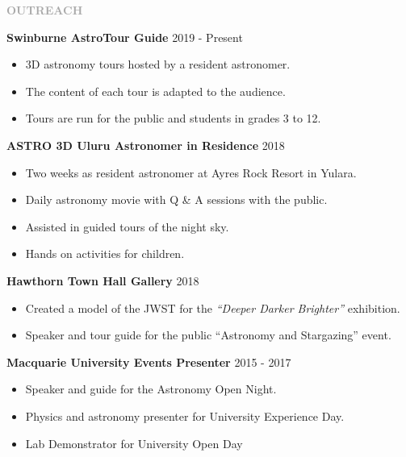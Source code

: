 \documentclass[11pt]{extarticle}
\def\Vhrulefill{{\color{BurntOrange}{\leavevmode\leaders\hrule height 1.2ex depth \dimexpr0.5pt-0.9ex\hfill\kern5pt}}}
\begin{document}
\vspace{3ex}
\noindent
\textcolor{darkgray}{\Large\normalfont\bfseries\MakeUppercase{Outreach}} \Vhrulefill
\vspace{2ex}



\noindent
\textbf{Swinburne AstroTour Guide} \hfill 2019 - Present
\begin{itemize}[noitemsep]
    \item 3D astronomy tours hosted by a resident astronomer.  
    \item The content of each tour is adapted to the audience.
    \item Tours are run for the public and students in grades 3 to 12. 
\end{itemize}

\noindent
\textbf{ASTRO 3D Uluru Astronomer in Residence} \hfill 2018 \par 
{}
\begin{itemize}[noitemsep]
\item Two weeks as resident astronomer at Ayres Rock Resort in Yulara.
\item Daily astronomy movie with Q \& A sessions with the public.
\item Assisted in guided tours of the night sky.
\item Hands on activities for children.
\end{itemize}

\noindent
\textbf{Hawthorn Town Hall Gallery} \hfill 2018 \par 
{}
\begin{itemize}[noitemsep]
\item Created a model of the JWST for the \emph{``Deeper Darker Brighter''} exhibition.
\item Speaker and tour guide for the public ``Astronomy and Stargazing'' event. 
\end{itemize}

\noindent
\textbf{Macquarie University Events Presenter} \hfill 2015 - 2017 \par
{}
\begin{itemize}[noitemsep]
\item Speaker and guide for the Astronomy Open Night.
\item Physics and astronomy presenter for University Experience Day.
\item Lab Demonstrator for University Open Day
\end{itemize}
\end{document}

